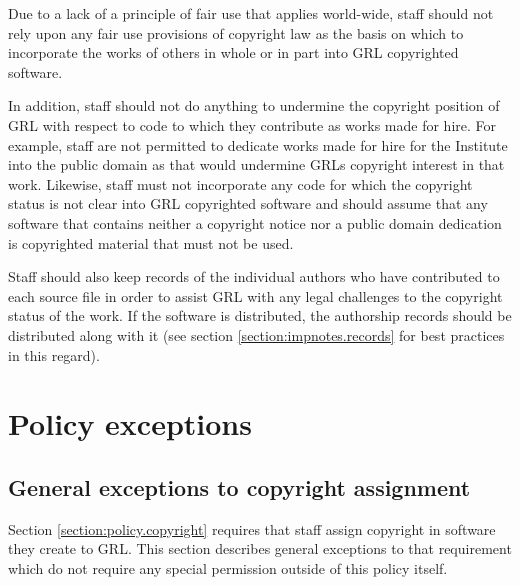 \documentclass[10pt,a4paper]{article}
\begin{document}
\par Due to a lack of a principle of fair use that applies world-wide, staff should not 
rely upon any fair use provisions of copyright law as the basis on which to 
incorporate the works of others in whole or in part into GRL copyrighted software. 

\par In addition, staff should not do anything to undermine the copyright position of GRL 
with respect to code to which they contribute as works made for hire. For example, 
staff are not permitted to dedicate works made for hire for the Institute into the 
public domain as that would undermine GRLs copyright interest in that work. 
Likewise, staff must not incorporate any code for which the copyright status is 
not clear into GRL copyrighted software and should assume that any software 
that contains neither a copyright notice nor a public domain dedication is copyrighted 
material that must not be used. 


\par Staff should also keep records of the individual authors who have contributed to 
each source file in order to assist GRL with any legal challenges to the copyright 
status of the work. If the software is distributed, the authorship records should be 
distributed along with it (see section \ref{section:impnotes.records} for best practices 
in this regard). 



\section{Policy exceptions}
\label{section:exceptions}

\subsection{General exceptions to copyright assignment}
\label{section:exceptions.general}
Section \ref{section:policy.copyright} requires that staff assign copyright in 
software they create to GRL. This section describes general exceptions to 
that requirement which do not require any special permission outside of this 
policy itself. 
\end{document}
